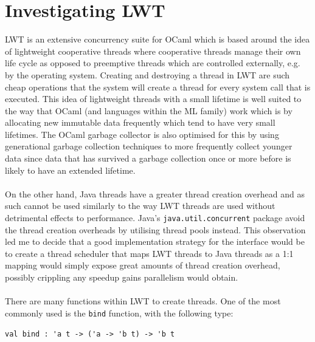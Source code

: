 \documentclass[12pt,twoside,notitlepage]{report}
\begin{document}
\section{Investigating LWT}
\label{sec:investigating_lwt}
%
%
LWT is an extensive concurrency suite for OCaml which is based around the idea of lightweight cooperative threads\cite{dimino2012} where cooperative threads manage their own life cycle as opposed to preemptive threads which are
controlled externally, e.g. by the operating system. Creating and destroying a thread in LWT are such cheap operations that the system will create a thread for every system call that is executed. This idea of lightweight threads with
a small lifetime is well suited to the way that OCaml (and languages within the ML family) work which is by allocating new immutable data frequently which tend to have very small lifetimes. The OCaml garbage collector is also
optimised for this by using generational garbage collection techniques to more frequently collect younger data since data that has survived a garbage collection once or more before is likely to have an extended
lifetime\cite{chailloux2000}.
\hfill\\
\hfill\\
On the other hand, Java threads have a greater thread creation overhead and as such cannot be used similarly to the way LWT threads are used without detrimental effects to performance. Java's {\tt java.util.concurrent} package avoid
the thread creation overheads by utilising thread pools instead\cite{web:threadpools}. This observation led me to decide that a good implementation strategy for the interface would be to  create a thread scheduler that maps LWT
threads to Java threads as a 1:1 mapping would simply expose great amounts of thread creation overhead, possibly crippling any speedup gains parallelism would obtain.
\hfill\\
\hfill\\
%
%
There are many functions within LWT to create threads. One of the most commonly used is the {\tt bind} function, with the following type:
\hfill\\
\begin{lstlisting}
val bind : 'a t -> ('a -> 'b t) -> 'b t
\end{lstlisting}
\end{document}
